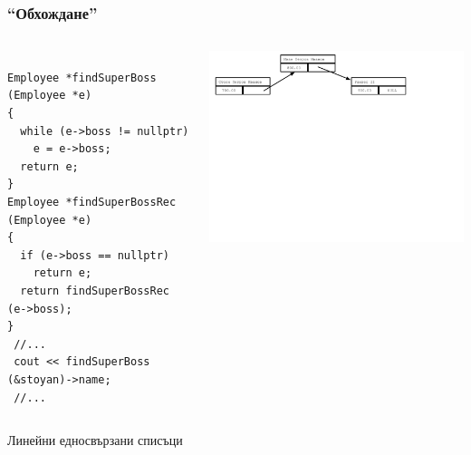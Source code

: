 \documentclass{beamer}
\begin{document}
\begin{frame}[fragile]
\frametitle{``Обхождане''}

\begin{columns}[c]
  \begin{column}{0.55\textwidth}
\begin{flushleft}
\begin{lstlisting}

Employee *findSuperBoss (Employee *e)
{
  while (e->boss != nullptr)
    e = e->boss;
  return e;
}
Employee *findSuperBossRec (Employee *e)
{
  if (e->boss == nullptr)
    return e;
  return findSuperBossRec (e->boss);
}
 //...
 cout << findSuperBoss (&stoyan)->name;
 //...

\end{lstlisting}  
\end{flushleft}

  \end{column}
  \begin{column}{0.45\textwidth}
\hspace{-150px}
\includegraphics[width=10.5cm]{images/00_rec_obj_three_objects_linked.pdf}

  \end{column}
\end{columns}
\end{frame}



\begin{frame}
\centerline{Линейни едносвързани списъци}
\end{frame}
\end{document}
